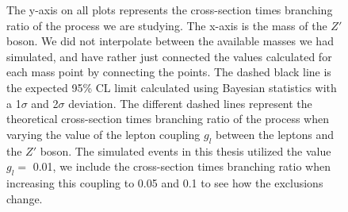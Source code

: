 \documentclass[12pt, a4paper]{book}
\begin{document}
\begin{figure}[!ht]
{   The y-axis on all plots represents the cross-section times branching ratio of the process we are studying. The x-axis is the mass of the $Z'$ boson. We did not interpolate between the available masses we had simulated, 
   and have rather just connected the values calculated for each mass point by connecting the points. The dashed black line is the expected 95\% CL limit calculated using Bayesian statistics with a 1$\sigma$ and 2$\sigma$ deviation. 
   The different dashed lines represent the theoretical cross-section times branching ratio of the process when varying the value of the lepton coupling $g_l$ between the leptons and the $Z'$ boson. The simulated events in this thesis utilized the value $g_l=$ 0.01, we include the cross-section times branching ratio when increasing this coupling to 0.05 and 0.1 to see how the exclusions change. 
   }\label{fig:comp_HDS}
\end{figure}
\end{document}
